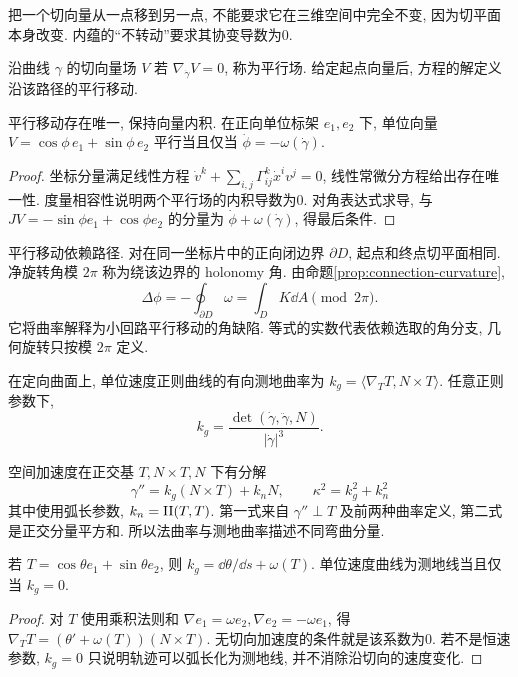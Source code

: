 把一个切向量从一点移到另一点, 不能要求它在三维空间中完全不变, 因为切平面本身改变. 内蕴的“不转动”要求其协变导数为0.
\begin{definition}
沿曲线 $\gamma$ 的切向量场 $V$ 若 $\nabla_{\dot\gamma}V=0$, 称为平行场. 给定起点向量后, 方程的解定义沿该路径的平行移动.
\end{definition}
\begin{proposition}\label{prop:parallel}
平行移动存在唯一, 保持向量内积. 在正向单位标架 $e_1,e_2$ 下, 单位向量 $V=\cos\phi\,e_1+\sin\phi\,e_2$ 平行当且仅当 $\dot\phi=-\omega(\dot\gamma)$.
\end{proposition}
\begin{proof}
坐标分量满足线性方程 $\dot v^k+\sum_{i,j}\Gamma^k_{ij}\dot x^iv^j=0$, 线性常微分方程给出存在唯一性. 度量相容性说明两个平行场的内积导数为0. 对角表达式求导, 与 $JV=-\sin\phi e_1+\cos\phi e_2$ 的分量为 $\dot\phi+\omega(\dot\gamma)$, 得最后条件.
\end{proof}
平行移动依赖路径. 对在同一坐标片中的正向闭边界 $\partial D$, 起点和终点切平面相同. 净旋转角模 $2\pi$ 称为绕该边界的 holonomy 角. 由命题\ref{prop:connection-curvature},
\begin{equation}\label{eq:holonomy}
 \Delta\phi=-\oint_{\partial D}\omega=\int_D K\dd A\pmod{2\pi}.
\end{equation}
它将曲率解释为小回路平行移动的角缺陷. 等式的实数代表依赖选取的角分支, 几何旋转只按模 $2\pi$ 定义.
\begin{definition}
在定向曲面上, 单位速度正则曲线的有向测地曲率为 $k_g=\langle\nabla_TT,N\times T\rangle$. 任意正则参数下,
\[
 k_g=\frac{\det(\dot\gamma,\ddot\gamma,N)}{|\dot\gamma|^3}.
\]
\end{definition}
空间加速度在正交基 $T,N\times T,N$ 下有分解
\begin{equation}\label{eq:darboux}
 \gamma''=k_g(N\times T)+k_nN,\qquad \kappa^2=k_g^2+k_n^2
\end{equation}
其中使用弧长参数, $k_n=\mathrm{II}(T,T)$. 第一式来自 $\gamma''\perp T$ 及前两种曲率定义, 第二式是正交分量平方和. 所以法曲率与测地曲率描述不同弯曲分量.
\begin{proposition}\label{prop:kg-angle}
若 $T=\cos\theta e_1+\sin\theta e_2$, 则 $k_g=\dd\theta/\dd s+\omega(T)$. 单位速度曲线为测地线当且仅当 $k_g=0$.
\end{proposition}
\begin{proof}
对 $T$ 使用乘积法则和 $\nabla e_1=\omega e_2,\nabla e_2=-\omega e_1$, 得 $\nabla_TT=(\theta'+\omega(T))(N\times T)$. 无切向加速度的条件就是该系数为0. 若不是恒速参数, $k_g=0$ 只说明轨迹可以弧长化为测地线, 并不消除沿切向的速度变化.
\end{proof}
